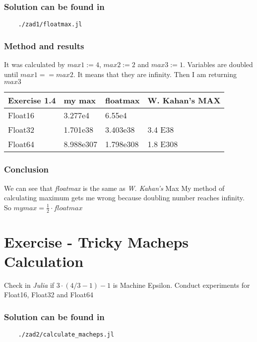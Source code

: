 \documentclass[12pt]{article}
\begin{document}
\subsubsection*{Solution can be found in}
\begin{verbatim}
    ./zad1/floatmax.jl
\end{verbatim}
\subsubsection*{Method and results}
It was calculated by $max1 := 4$, $max2 := 2$ and $max3:=1$. 
Variables are doubled until $max1 == max2$. It means that they are infinity. 
Then I am returning $max3$ 
\begin{table}[!ht]
    \centering
    \begin{tabular}{|l|l|l|l|}
    \hline
        Exercise 1.4 & my max & floatmax & W. Kahan's MAX \\ \hline
        Float16 & 3.277e4 & 6.55e4 & ~ \\ \hline
        Float32 & 1.701e38 & 3.403e38 & 3.4 E38 \\ \hline
        Float64 & 8.988e307 & 1.798e308 & 1.8 E308 \\ \hline
    \end{tabular}
\end{table}
\subsubsection*{Conclusion}
We can see that \emph{floatmax} is the same as \emph{W. Kahan's} Max \newline
My method of calculating maximum gets me wrong because doubling number reaches infinity. 
So $my max = \frac{1}{2} \cdot floatmax$
\section{Exercise - Tricky Macheps Calculation}
Check in \emph{Julia} if $3\cdot(4/3-1)-1$ is Machine Epsilon. Conduct experiments for Float16, Float32 and Float64
\subsubsection*{Solution can be found in}
\begin{verbatim}
    ./zad2/calculate_macheps.jl
\end{verbatim}
\end{document}
